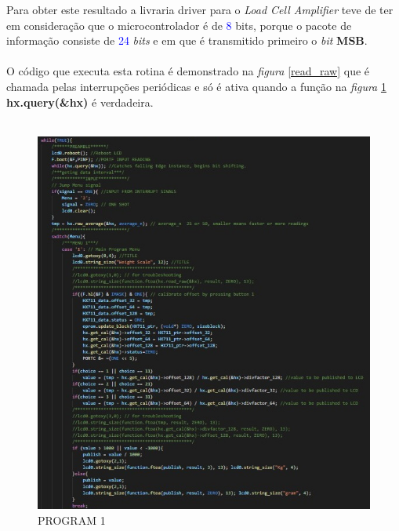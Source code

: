 Para obter este resultado a livraria driver para o \textit{Load Cell Amplifier} teve de ter em consideração que o microcontrolador é de \textcolor{blue}{8} bits, porque o pacote de informação consiste de \textcolor{blue}{24} \textit{bits} e em que é transmitido primeiro o \textit{bit} \textbf{MSB}.
\\
\\
O código que executa esta rotina é demonstrado na \textit{figura} \ref{read_raw} que é chamada pelas interrupções periódicas e só é ativa quando a função na \textit{figura} \ref{Main_While_Balanca} \textbf{hx.query(\&hx)} é verdadeira.
\\
\\
\begin{minipage}[l]{\linewidth}
\begin{minipage}[l]{.60\linewidth}
\begin{figure}[H]
	\flushleft
	\captionsetup{justification=raggedright,singlelinecheck=false}
	\includegraphics[scale=0.55]{./image/PESTA/Code/Main_While_Balanca.jpg}
	\caption{PROGRAM 1}
	\label{Main_While_Balanca}
\end{figure}
\end{minipage}
\begin{minipage}[l]{.33\linewidth}

\end{minipage}
\end{minipage}
